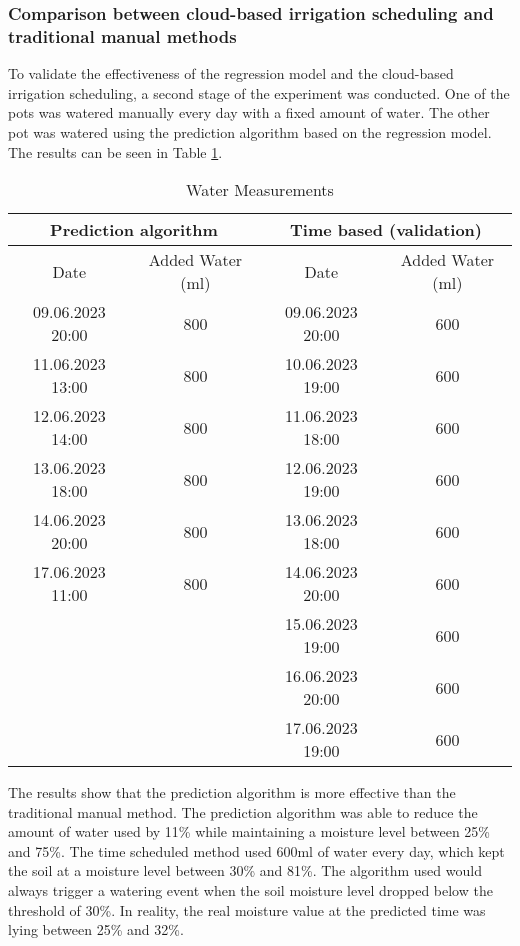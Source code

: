\documentclass[11pt]{scrartcl} %
\begin{document}
\subsubsection{Comparison between cloud-based irrigation scheduling and traditional manual methods}
To validate the effectiveness of the regression model and the cloud-based irrigation scheduling, a second stage of the experiment was conducted.
\newline One of the pots was watered manually every day with a fixed amount of water. The other pot was watered using the prediction algorithm based on the regression model. The results can be seen in Table \ref{table:water_measurements}.
\begin{table}[H]
	\centering
	\caption{Water Measurements}
	\begin{tabular}{|c|c|c|c|}
	  \hline
	  \multicolumn{2}{|c|}{Prediction algorithm} & \multicolumn{2}{c|}{Time based (validation)} \\
	  \hline
	  \multicolumn{1}{|c|}{Date} & \multicolumn{1}{c|}{Added Water (ml)} & \multicolumn{1}{c|}{Date} & \multicolumn{1}{c|}{Added Water (ml)} \\
	  \hline
	  09.06.2023 20:00 & 800 & 09.06.2023 20:00 & 600 \\
	  \hline
	  11.06.2023 13:00 & 800 & 10.06.2023 19:00 & 600 \\
	  \hline
	  12.06.2023 14:00 & 800 & 11.06.2023 18:00 & 600 \\
	  \hline
	  13.06.2023 18:00 & 800 & 12.06.2023 19:00 & 600 \\
	  \hline
	  14.06.2023 20:00 & 800 & 13.06.2023 18:00 & 600 \\
	  \hline
	  17.06.2023 11:00 & 800 & 14.06.2023 20:00 & 600 \\
	  \hline
	   &  & 15.06.2023 19:00 & 600 \\
	  \hline
	   &  & 16.06.2023 20:00 & 600 \\
	  \hline
	   &  & 17.06.2023 19:00 & 600 \\
	  \hline
	\end{tabular}
	\label{table:water_measurements}
  \end{table}
The results show that the prediction algorithm is more effective than the traditional manual method. The prediction algorithm was able to reduce the amount of water used by 11\% while maintaining a moisture level between 25\% and 75\%. The time scheduled method used 600ml of water every day, which kept the soil at a moisture level between 30\% and 81\%.
\newline The algorithm used would always trigger a watering event when the soil moisture level dropped below the threshold of 30\%. In reality, the real moisture value at the predicted time was lying between 25\% and 32\%.
\end{document}
